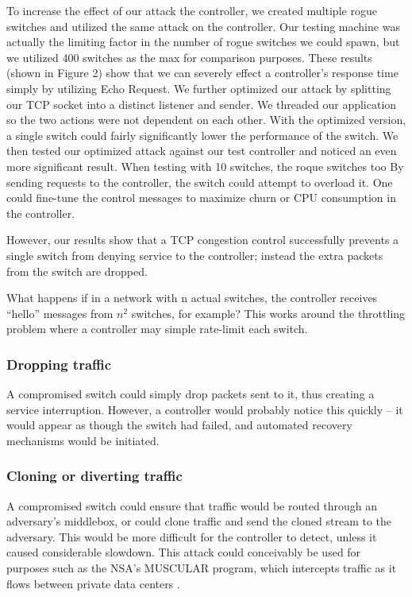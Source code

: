    To increase the effect of our attack the controller, we created multiple rogue switches and utilized the same attack on the controller. Our testing machine was actually the limiting factor in the number of rogue switches we could spawn, but we utilized 400 switches as the max for comparison purposes. These results (shown in Figure 2) show that we can severely effect a controller's response time simply by utilizing Echo Request. We further optimized our attack by splitting our TCP socket into a distinct listener and sender. We threaded our application so the two actions were not dependent on each other. With the optimized version, a single switch could fairly significantly lower the performance of the switch. We then tested our optimized attack against our test controller and noticed an even more significant result. When testing with 10 switches, the roque switches 
 too
By sending requests to the controller, the switch could attempt to overload it. One could fine-tune the control messages to maximize churn or CPU consumption in the controller.

However, our results show that a TCP congestion control successfully prevents a single switch from denying service to the controller; instead the extra packets from the switch are dropped.

What happens if in a network with n actual switches, the controller receives “hello” messages from $n^2$ switches, for example? This works around the throttling problem where a controller may simple rate-limit each switch.

\subsubsection{Dropping traffic} 
A compromised switch could simply drop packets sent to it, thus creating a service interruption. However, a controller would probably notice this quickly -- it would appear as though the switch had failed, and automated recovery mechanisms would be initiated.

\subsubsection{Cloning or diverting traffic}
A compromised switch could ensure that traffic would be routed through an adversary’s middlebox, or could clone traffic and send the cloned stream to the adversary. This would be more difficult for the controller to detect, unless it caused considerable slowdown. This attack could conceivably be used for purposes such as the NSA’s MUSCULAR program, which intercepts traffic as it flows between private data centers \cite{muscular}. 

